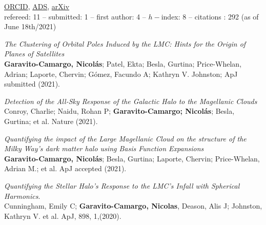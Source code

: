 \documentclass[UTF8]{article}
\begin{document}
\noindent \href{https://orcid.org/0000-0001-7107-1744}{ORCID},
\href{https://ui.adsabs.harvard.edu/search/q=docs(library%2F0X5_bcuLT4iE-6-Nko0kmg)&sort=date%20desc%2C%20bibcode%20desc&p_=0}{ADS},
\href{https://arxiv.org/search/?query=garavito-camargo&searchtype=all}{arXiv}\\
refereed: 11 -- submitted: 1 -- first author: 4 -- $h-$index: 8 -- citations :
292 (as of June 18th/2021) 
\begin{etaremune}

\item \textit{The Clustering of Orbital Poles Induced by the LMC: Hints for
      the Origin of Planes of Satellites}\\ 
      \textbf{Garavito-Camargo, Nicol\'as}; Patel, Ekta; Besla, Gurtina; Price-Whelan,
      Adrian; Laporte, Chervin; G\'omez, Facundo A; Kathryn V. Johnston; ApJ
      submitted (2021). 

\item \textit{Detection of the All-Sky Response of the Galactic
  Halo to the Magellanic Clouds}\\ 
  Conroy, Charlie; Naidu, Rohan P; \textbf{Garavito-Camargo; Nicol\'as}; Besla,
  Gurtina; et al. Nature (2021). 

\item \textit{Quantifying the impact of the Large Magellanic Cloud on the
  structure of the Milky Way’s dark matter halo using Basis Function Expansions}\\ 
  \textbf{Garavito-Camargo, Nicol\'as}; Besla, Gurtina; Laporte,
  Chervin; Price-Whelan, Adrian M.; et al. ApJ accepted (2021). 

\item \textit{Quantifying the Stellar Halo's Response to the LMC's Infall with
  Spherical Harmonics}.\\
  Cunningham, Emily C; \textbf{Garavito-Camargo, Nicolas}, Deason, Alis J;
  Johnston, Kathryn V. et al. ApJ, 898, 1,(2020).


\end{etaremune}
\end{document}

